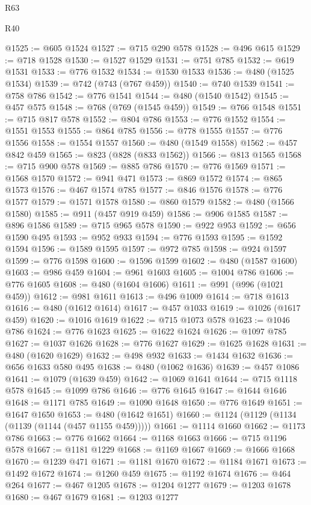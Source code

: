 \begin{lexlean}{R63}
\begin{lexlean}{R40}
\begin{coremodule}
{{{{{{{{{{{{{{{{{{{{{{{{{{{{{{{{{{{{{{{{{{{{{{{{{{{{{{{{{{{{{{{{{{{{{{{{{{{{{{{{{{{{{{{{{{{{{{{{{{{{{{{{{{{{{@1525 := @605 @1524
@1527 := @715 @290 @578
@1528 := @496 @615
@1529 := @718 @1528
@1530 := @1527 @1529
@1531 := @751 @785
@1532 := @619 @1531
@1533 := @776 @1532
@1534 := @1530 @1533
@1536 := @480 (@1525 @1534)
@1539 := @742 (@743 (@767 @459))
@1540 := @740 @1539
@1541 := @758 @786
@1542 := @776 @1541
@1544 := @480 (@1540 @1542)
@1545 := @457 @575
@1548 := @768 (@769 (@1545 @459))
@1549 := @766 @1548
@1551 := @715 @817 @578
@1552 := @804 @786
@1553 := @776 @1552
@1554 := @1551 @1553
@1555 := @864 @785
@1556 := @778 @1555
@1557 := @776 @1556
@1558 := @1554 @1557
@1560 := @480 (@1549 @1558)
@1562 := @457 @842 @459
@1565 := @823 (@828 (@833 @1562))
@1566 := @813 @1565
@1568 := @715 @900 @578
@1569 := @885 @786
@1570 := @776 @1569
@1571 := @1568 @1570
@1572 := @941 @471
@1573 := @869 @1572
@1574 := @865 @1573
@1576 := @467 @1574 @785
@1577 := @846 @1576
@1578 := @776 @1577
@1579 := @1571 @1578
@1580 := @860 @1579
@1582 := @480 (@1566 @1580)
@1585 := @911 (@457 @919 @459)
@1586 := @906 @1585
@1587 := @896 @1586
@1589 := @715 @965 @578
@1590 := @922 @953
@1592 := @656 @1590 @495
@1593 := @952 @933
@1594 := @776 @1593
@1595 := @1592 @1594
@1596 := @1589 @1595
@1597 := @972 @785
@1598 := @924 @1597
@1599 := @776 @1598
@1600 := @1596 @1599
@1602 := @480 (@1587 @1600)
@1603 := @986 @459
@1604 := @961 @1603
@1605 := @1004 @786
@1606 := @776 @1605
@1608 := @480 (@1604 @1606)
@1611 := @991 (@996 (@1021 @459))
@1612 := @981 @1611
@1613 := @496 @1009
@1614 := @718 @1613
@1616 := @480 (@1612 @1614)
@1617 := @457 @1033
@1619 := @1026 (@1617 @459)
@1620 := @1016 @1619
@1622 := @715 @1073 @578
@1623 := @1046 @786
@1624 := @776 @1623
@1625 := @1622 @1624
@1626 := @1097 @785
@1627 := @1037 @1626
@1628 := @776 @1627
@1629 := @1625 @1628
@1631 := @480 (@1620 @1629)
@1632 := @498 @932
@1633 := @1434 @1632
@1636 := @656 @1633 @580 @495
@1638 := @480 (@1062 @1636)
@1639 := @457 @1086
@1641 := @1079 (@1639 @459)
@1642 := @1069 @1641
@1644 := @715 @1118 @578
@1645 := @1099 @786
@1646 := @776 @1645
@1647 := @1644 @1646
@1648 := @1171 @785
@1649 := @1090 @1648
@1650 := @776 @1649
@1651 := @1647 @1650
@1653 := @480 (@1642 @1651)
@1660 := @1124 (@1129 (@1134 (@1139 (@1144 (@457 @1155 @459)))))
@1661 := @1114 @1660
@1662 := @1173 @786
@1663 := @776 @1662
@1664 := @1168 @1663
@1666 := @715 @1196 @578
@1667 := @1181 @1229
@1668 := @1169 @1667
@1669 := @1666 @1668
@1670 := @1239 @471
@1671 := @1181 @1670
@1672 := @1184 @1671
@1673 := @1492 @1672
@1674 := @1260 @459
@1675 := @1192 @1674
@1676 := @464 @264
@1677 := @467 @1205
@1678 := @1204 @1277
@1679 := @1203 @1678
@1680 := @467 @1679
@1681 := @1203 @1277
}}}}}}}}}}}}}}}}}}}}}}}}}}}}}}}}}}}}}}}}}}}}}}}}}}}}}}}}}}}}}}}}}}}}}}}}}}}}}}}}}}}}}}}}}}}}}}}}}}}}}}}}}}}}}
\end{coremodule}
\end{lexlean}
\end{lexlean}
